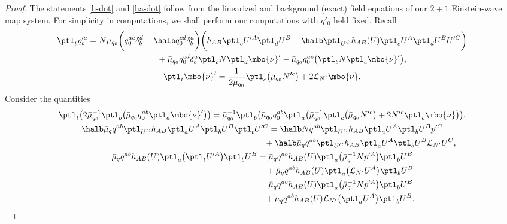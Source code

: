 \begin{proof}
The statements \eqref{h-dot} and \eqref{ha-dot} follow from the linearized and background (exact) field equations of our $2+1$ Einstein-wave map system. For simplicity in computations, we shall perform our computations with $q'_0$
held fixed. Recall
\begin{gather*}
\ptl_t \varrho'^a_b = N \bar{\mu}_{q_0} \biggl(q^{ac}_0 \delta^d_b - \halb q_0^{cd} \delta^a_b\biggr) \biggl(h_{AB} \ptl_c U'^A \ptl_d U^B + \halb \ptl_{U^C} h_{AB} (U) \ptl_c U^A \ptl_d U^B U'^C\biggr) \notag\\ \hphantom{\ptl_t \varrho'^a_b =}{}
+ \bar{\mu}_{q_0} q_0^{cd} \delta^a_b \ptl_c N \ptl_d \mbo{\nu}' - \bar{\mu}_{q_0} q^{ac}_0 \bigl(\ptl_b N \ptl_c \mbo{\nu}'\bigr), \\
\ptl_t \mbo{\nu}'= \frac{1}{2 \bar{\mu}_{q_0}} \ptl_c \bigl(\bar{\mu}_{q_0} N'^c\bigr) + 2 \mathcal{L}_{N'} \mbo{\nu}.
\end{gather*}
Consider the quantities
\begin{gather*}
\ptl_t \bigl(2 \bar{\mu}^{-1}_{q_0} \ptl_b \bigl(\bar{\mu}_{q_0} q^{ab}_0 \ptl_a \mbo{\nu}'\bigr) \bigr) = \bar{\mu}^{-1}_{q_0} \ptl_b \bigl(\bar{\mu}_{q_0} q^{ab}_0 \ptl_a \bigl( \bar{\mu}^{-1}_{q_0} \ptl_c \bigl(\bar{\mu}_{q_0} N'^c\bigr) + 2 N'^c\ptl_c \mbo{\nu}\bigr)\bigr),
\\
\halb \bar{\mu}_q q^{ab} \ptl_{U^C} h_{AB} \ptl_a U^A \ptl_b U^B \ptl_t U'^C = \halb N q^{ab} \ptl_{U^C} h_{AB} \ptl_a U^A \ptl_b U^B p'^C \notag\\
\hphantom{\halb \bar{\mu}_q q^{ab} \ptl_{U^C} h_{AB} \ptl_a U^A \ptl_b U^B \ptl_t U'^C =}{}
+ \halb \bar{\mu}_q q^{ab} \ptl_{U^C} h_{AB} \ptl_a U^A \ptl_b U^B \mathcal{L}_{N'} U^C, \\
 \bar{\mu}_q q^{ab} h_{AB}(U) \ptl_a \bigl(\ptl_t U'^A\bigr) \ptl_b U^B= \bar{\mu}_q q ^{ab} h_{AB}(U) \ptl_a \bigl(\bar{\mu}^{-1}_q N p'^A\bigr)
 \ptl_b U^B \notag\\ \hphantom{\bar{\mu}_q q^{ab} h_{AB}(U) \ptl_a \bigl(\ptl_t U'^A\bigr) \ptl_b U^B=}{}
 + \bar{\mu}_q q ^{ab} h_{AB}(U) \ptl_a \bigl(\mathcal{L}_{N'} U^A\bigr) \ptl_b U^B
 \notag\\ \hphantom{\bar{\mu}_q q^{ab} h_{AB}(U) \ptl_a \bigl(\ptl_t U'^A\bigr) \ptl_b U^B}{}
 = \bar{\mu}_q q ^{ab} h_{AB}(U) \ptl_a \bigl(\bar{\mu}^{-1}_q N p'^A\bigr)\ptl_b U^B
 \notag\\ \hphantom{\bar{\mu}_q q^{ab} h_{AB}(U) \ptl_a \bigl(\ptl_t U'^A\bigr) \ptl_b U^B=}{}
 + \bar{\mu}_q q ^{ab} h_{AB}(U) \mathcal{L}_{N'} \bigl(\ptl_a U^A\bigr) \ptl_b U^B.

\end{gather*}
\end{proof}
